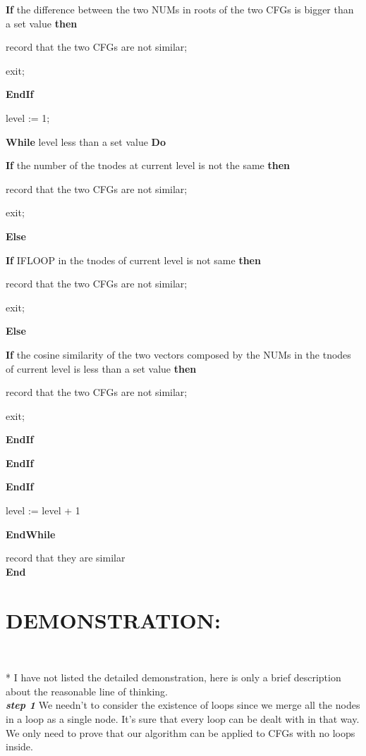 \documentclass[12pt]{article}
\begin{document}
\quad \textbf{If} the difference between the two NUMs in roots of the two CFGs is bigger than a set value \textbf{then}\

\qquad record that the two CFGs are not similar;\

\qquad exit;\

\quad \textbf{EndIf}\

\quad level := 1;\

\quad \textbf{While} level less than a set value \textbf{Do}\

\qquad \textbf{If} the number of the tnodes at current level is not the same \textbf{then}\

\qquad \quad record that the two CFGs are not similar;\

\qquad \quad exit;\

\qquad \textbf{Else}\

\qquad \quad \textbf{If} IFLOOP in the tnodes of current level is not same \textbf{then}\

\qquad \qquad record that the two CFGs are not similar;\

\qquad \qquad exit;\

\qquad \quad \textbf{Else}\

\qquad \qquad \textbf{If} the cosine similarity of  the two vectors composed by the NUMs in the tnodes of current level is less than a set value \textbf{then}\

\qquad \qquad \quad record that the two CFGs are not similar;\

\qquad \qquad \quad exit;\

\qquad \qquad \textbf{EndIf}\

\qquad \quad \textbf{EndIf}\

\qquad \textbf{EndIf}\

\qquad level :=  level + 1\

\quad \textbf{EndWhile}\

\quad record that they are similar\
\\
\textbf{End} \\


\section{DEMONSTRATION:}\

* I have not listed the detailed demonstration, here is only a brief description about the reasonable line of thinking.\\

\textit{\textbf{step 1 }}	We needn't to consider the existence of loops since we merge all the nodes in a loop as a single node. It's sure that every loop can be dealt with in that way. We only need to prove that our algorithm can be applied to CFGs with no loops inside.\
\end{document}
